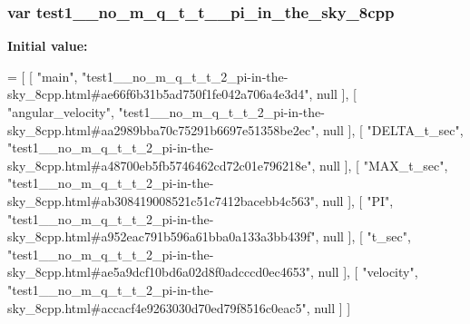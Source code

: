\subsubsection[{\texorpdfstring{test1\+\_\+\+\_\+no\+\_\+m\+\_\+q\+\_\+t\+\_\+t\+\_\+2\+\_\+pi\+\_\+in\+\_\+the\+\_\+sky\+\_\+8cpp}{test1__no_m_q_t_t_2_pi_in_the_sky_8cpp}}]{\setlength{\rightskip}{0pt plus 5cm}var test1\+\_\+\+\_\+no\+\_\+m\+\_\+q\+\_\+t\+\_\+t\+\_\+\_\+pi\+\_\+in\+\_\+the\+\_\+sky\+\_\+8cpp}\hypertarget{test1____no__m__q__t__t__2__pi-in-the-sky__8cpp_8js_a405e2a9063c7eafb9c94ad3c55036fcb}{}\label{test1____no__m__q__t__t__2__pi-in-the-sky__8cpp_8js_a405e2a9063c7eafb9c94ad3c55036fcb}
{\bfseries Initial value\+:}
\begin{DoxyCode}
=
[
    [ \textcolor{stringliteral}{"main"}, \textcolor{stringliteral}{"test1\_\_no\_m\_q\_t\_t\_2\_pi-in-the-sky\_8cpp.html#ae66f6b31b5ad750f1fe042a706a4e3d4"}, null ],
    [ \textcolor{stringliteral}{"angular\_velocity"}, \textcolor{stringliteral}{"test1\_\_no\_m\_q\_t\_t\_2\_pi-in-the-sky\_8cpp.html#aa2989bba70c75291b6697e51358be2ec"}, 
      null ],
    [ \textcolor{stringliteral}{"DELTA\_t\_sec"}, \textcolor{stringliteral}{"test1\_\_no\_m\_q\_t\_t\_2\_pi-in-the-sky\_8cpp.html#a48700eb5fb5746462cd72c01e796218e"}, null 
      ],
    [ \textcolor{stringliteral}{"MAX\_t\_sec"}, \textcolor{stringliteral}{"test1\_\_no\_m\_q\_t\_t\_2\_pi-in-the-sky\_8cpp.html#ab308419008521c51c7412bacebb4c563"}, null ],
    [ \textcolor{stringliteral}{"PI"}, \textcolor{stringliteral}{"test1\_\_no\_m\_q\_t\_t\_2\_pi-in-the-sky\_8cpp.html#a952eac791b596a61bba0a133a3bb439f"}, null ],
    [ \textcolor{stringliteral}{"t\_sec"}, \textcolor{stringliteral}{"test1\_\_no\_m\_q\_t\_t\_2\_pi-in-the-sky\_8cpp.html#ae5a9dcf10bd6a02d8f0adcccd0ec4653"}, null ],
    [ \textcolor{stringliteral}{"velocity"}, \textcolor{stringliteral}{"test1\_\_no\_m\_q\_t\_t\_2\_pi-in-the-sky\_8cpp.html#accacf4e9263030d70ed79f8516c0eac5"}, null ]
]
\end{DoxyCode}

